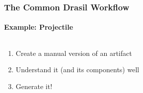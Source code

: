 \documentclass{beamer}
\begin{document}
\begin{frame}
    \frametitle{The Common Drasil Workflow}
    \framesubtitle{Example: Projectile}

    \begin{columns}[T,onlytextwidth]
        \begin{column}{.25\textwidth}
            \begin{enumerate}
                \item<2-|handout:1-> Create a manual version of an artifact
                \item<3-|handout:2-> Understand it (and its components) well
                \item<4-|handout:3> Generate it!
            \end{enumerate}
        \end{column}
        \begin{column}{.75\textwidth}
        \end{column}
    \end{columns}


\end{frame}
\end{document}
